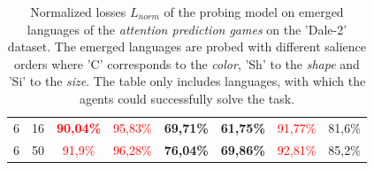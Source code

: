 \begin{table}[ht]
\begin{tabular}{cc|c|c|c|c|c|c}
        {6} & {16}  & \textcolor{red}{\textbf{90,04\%}} & \textcolor{red}{95,83\%}          & \textbf{69,71\%}         & \textbf{61,75\%}         & \textcolor{red}{91,77\%} & {81,6\%}                 \\
        {6} & {50}  & \textcolor{red}{91,9\%}           & \textcolor{red}{96,28\%}          & \textbf{76,04\%}         & \textbf{69,86\%}         & \textcolor{red}{92,81\%} & {85,2\%}                 \\
        \bottomrule
    \end{tabular}
    \caption{Normalized losses $L_{norm}$ of the probing model on emerged languages of the \emph{attention prediction games} on the 'Dale-2' dataset. The emerged languages are probed with different salience orders where 'C' corresponds to the \emph{color}, 'Sh' to the \emph{shape} and 'Si' to the \emph{size}. The table only includes languages, with which the agents could successfully solve the task.}
    \label{tab:probing:attention-predictor:dale-2}
\end{table}

